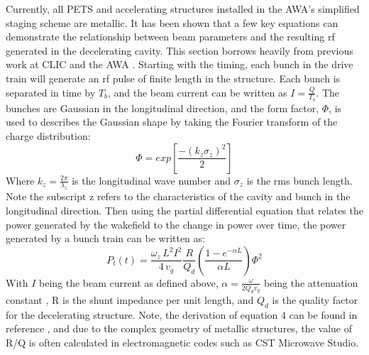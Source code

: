 \documentclass{iitthesis}
\begin{document}

Currently, all PETS and accelerating structures installed in the AWA's
simplified staging scheme are metallic. It has been shown that a few
key equations can demonstrate the relationship between beam parameters
and the resulting rf generated in the decelerating cavity. This section
borrows heavily from previous work at CLIC and the AWA \cite{key-3,key-8}. 
Starting with the timing, each bunch in the drive train will generate
an rf pulse of finite length in the structure. Each bunch is separated
in time by $T_{b}$, and the beam current can be written as $I=\frac{Q}{T_{b}}$.
The bunches are Gaussian in the longitudinal direction, and the form
factor, $\Phi$, is used to describes the Gaussian shape by taking
the Fourier transform of the charge distribution: 
\begin{equation}
\Phi=exp\left[\frac{-(k_{z}\sigma_{z})^{2}}{2}\right]
\end{equation}
Where $k_{z}=\frac{2\pi}{\lambda_{z}}$ is the longitudinal wave number
and $\sigma_{z}$ is the rms bunch length. Note the subscript z refers
to the characteristics of the cavity and bunch in the longitudinal
direction. Then using the partial differential equation that relates
the power generated by the wakefield to the change in power over time,
the power generated by a bunch train can be written as:
\begin{equation} \label{eq:rfpower}
P_{t}(t)=\frac{\omega_{z}\,L^{2}I^{2}}{4\,v_{g}}\frac{R}{Q_{d}}\left(\frac{1-e^{-\alpha L}}{\alpha L}\right)\Phi^{2}
\end{equation}
With $I$ being the beam current as defined above, $\alpha=\frac{\omega}{2Q_{d}v_{g}}$
being the attenuation constant \cite{key-9}, R is the shunt impedance
per unit length, and $Q_{d}$ is the quality factor for the decelerating
structure. Note, the derivation of equation 4 can be found in reference
\cite{key-8}, and due to the complex geometry of metallic structures,
the value of R/Q is often calculated in electromagnetic codes such
as CST Microwave Studio. 

\end{document}
